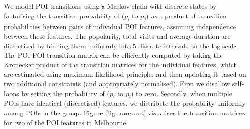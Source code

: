 We model POI transitions using a Markov chain with discrete %
states by factorising the transition probability of ($p_i$ to $p_j$) %
as a product of transition probabilities between pairs of individual POI features, %
assuming independence between these features.
The popularity, total visits and average duration are discretised by binning
them uniformly into $5$ discrete intervals on the log scale.
The POI-POI transition matrix can be efficiently computed by taking the Kronecker product of
the transition matrices for the individual features, which are estimated using maximum likelihood principle,
and then updating it based on two additional constraints (and appropriately normalised).
First we disallow self-loops by setting the probability of ($p_i$ to $p_i$) to zero.
Secondly, when multiple POIs have identical (discretised) features, we distribute the probability uniformly among POIs in the group.
Figure~\ref{fig:transmat} visualises the transition matrices for two of the POI features in Melbourne.
